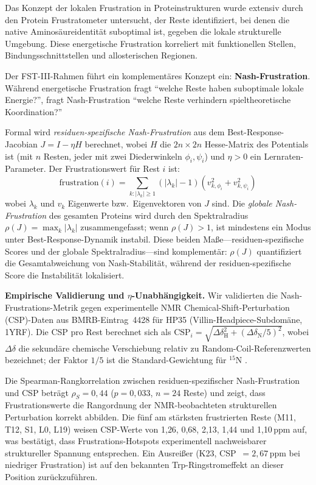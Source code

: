 \documentclass[12pt,a4paper]{article}
\theoremstyle{remark}
\begin{document}
Das Konzept der lokalen Frustration in Proteinstrukturen wurde extensiv durch den Protein Frustratometer \citep{Ferreiro2007,Ferreiro2014} untersucht, der Reste identifiziert, bei denen die native Aminos\"aureidentit\"at suboptimal ist, gegeben die lokale strukturelle Umgebung. Diese energetische Frustration korreliert mit funktionellen Stellen, Bindungsschnittstellen und allosterischen Regionen.

Der FST-III-Rahmen f\"uhrt ein komplement\"ares Konzept ein: \textbf{Nash-Frustration}. W\"ahrend energetische Frustration fragt ``welche Reste haben suboptimale lokale Energie?'', fragt Nash-Frustration ``welche Reste verhindern spieltheoretische Koordination?''

Formal wird \emph{residuen-spezifische Nash-Frustration} aus dem Best-Response-Jacobian $J = I - \eta H$ berechnet, wobei $H$ die $2n \times 2n$ Hesse-Matrix des Potentials ist (mit $n$ Resten, jeder mit zwei Diederwinkeln $\phi_i, \psi_i$) und $\eta > 0$ ein Lernraten-Parameter. Der Frustrationswert f\"ur Rest $i$ ist:
\begin{equation}
\text{frustration}(i) = \sum_{k: |\lambda_k| \geq 1} (|\lambda_k| - 1) \left( v_{k,\phi_i}^2 + v_{k,\psi_i}^2 \right)
\end{equation}
wobei $\lambda_k$ und $v_k$ Eigenwerte bzw.\ Eigenvektoren von $J$ sind. Die \emph{globale Nash-Frustration} des gesamten Proteins wird durch den Spektralradius $\rho(J) = \max_k |\lambda_k|$ zusammengefasst; wenn $\rho(J) > 1$, ist mindestens ein Modus unter Best-Response-Dynamik instabil. Diese beiden Ma\ss{}e---residuen-spezifische Scores und der globale Spektralradius---sind komplement\"ar: $\rho(J)$ quantifiziert die Gesamtabweichung von Nash-Stabilit\"at, w\"ahrend der residuen-spezifische Score die Instabilit\"at lokalisiert.

\textbf{Empirische Validierung und $\eta$-Unabh\"angigkeit.}
Wir validierten die Nash-Frustrations-Metrik gegen experimentelle NMR Chemical-Shift-Perturbation (CSP)-Daten aus BMRB-Eintrag~4428 \cite{BMRB4428} f\"ur HP35 (Villin-Headpiece-Subdom\"ane, 1YRF). Die CSP pro Rest berechnet sich als $\text{CSP}_i = \sqrt{\Delta\delta_{\text{H}}^2 + (\Delta\delta_{\text{N}}/5)^2}$, wobei $\Delta\delta$ die sekund\"are chemische Verschiebung relativ zu Random-Coil-Referenzwerten \cite{Wishart1995} bezeichnet; der Faktor $1/5$ ist die Standard-Gewichtung f\"ur ${}^{15}$N \cite{Williamson2013}.

Die Spearman-Rangkorrelation zwischen residuen-spezifischer Nash-Frustration und CSP betr\"agt $\rho_S = 0{,}44$ ($p = 0{,}033$, $n = 24$ Reste) und zeigt, dass Frustrationswerte die Rangordnung der NMR-beobachteten strukturellen Perturbation korrekt abbilden. Die f\"unf am st\"arksten frustrierten Reste (M11, T12, S1, L0, L19) weisen CSP-Werte von 1{,}26, 0{,}68, 2{,}13, 1{,}44 und 1{,}10\,ppm auf, was best\"atigt, dass Frustrations-Hotspots experimentell nachweisbarer struktureller Spannung entsprechen. Ein Ausrei\ss{}er (K23, CSP~$= 2{,}67$\,ppm bei niedriger Frustration) ist auf den bekannten Trp-Ringstromeffekt an dieser Position zur\"uckzuf\"uhren.
\end{document}
